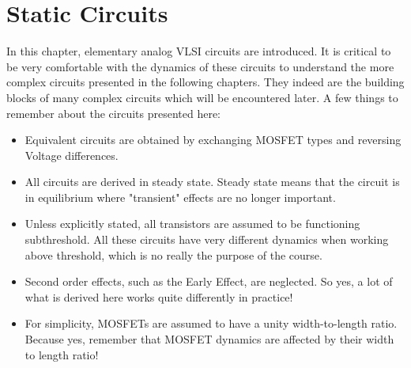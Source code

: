 \newpage
\section{Static Circuits}
In this chapter, elementary analog VLSI circuits are introduced. It is critical to be very comfortable with the dynamics of these circuits to understand the more complex circuits presented in the following chapters. They indeed are the building blocks of many complex circuits which will be encountered later. A few things to remember about the circuits presented here: 
\begin{itemize}
    \item Equivalent circuits are obtained by exchanging MOSFET types and reversing Voltage differences.
    \item All circuits are derived in steady state. Steady state means that the circuit is in equilibrium where "transient" effects are no longer important. 
    \item Unless explicitly stated, all transistors are assumed to be functioning subthreshold. All these circuits have very different dynamics when working above threshold, which is no really the purpose of the course. 
    \item Second order effects, such as the Early Effect, are neglected. So yes, a lot of what is derived here works quite differently in practice!
    \item For simplicity, MOSFETs are assumed to have a unity width-to-length ratio. Because yes, remember that MOSFET dynamics are affected by their width to length ratio! 
\end{itemize}









